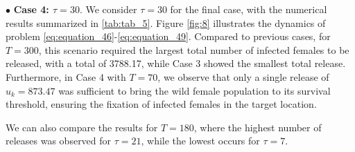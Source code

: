 \documentclass[10pt,letterpaper]{article}
\begin{document}
$\bullet$ \textbf{Case 4: $\tau = 30$}. We consider $\tau = 30$ for the final case, with the numerical results summarized in \eqref{tab:tab_5}. Figure \eqref{fig:8} illustrates the dynamics of problem \eqref{eq:equation_46}-\eqref{eq:equation_49}. Compared to previous cases, for $T = 300$, this scenario required the largest total number of infected females to be released, with a total of 3788.17, while Case 3 showed the smallest total release. Furthermore, in Case 4 with $T = 70$, we observe that only a single release of $u_k = 873.47$ was sufficient to bring the wild female population to its survival threshold, ensuring the fixation of infected females in the target location.

We can also compare the results for $T = 180$, where the highest number of releases was observed for $\tau = 21$, while the lowest occurs for $\tau = 7$.
\end{document}
